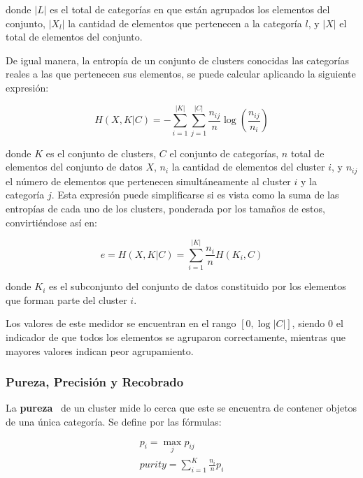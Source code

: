 \noindent
donde $|L|$ es el total de categorías en que están agrupados los elementos del conjunto, $|X_l|$ la cantidad de elementos que pertenecen a la categoría $l$, y $|X|$ el total de elementos del conjunto.

De igual manera, la entropía de un conjunto de clusters conocidas las categorías reales a las que pertenecen sus elementos, se puede calcular aplicando la siguiente expresión:

\begin{equation}
    \label{eq:clustering-entropy-conditional}
    H(X, K|C) = -\sum_{i=1}^{|K|}\sum_{j=1}^{|C|}{\frac{n_{ij}}{n}\log \left( \frac{n_{ij}}{n_i} \right)}
\end{equation}

\noindent
donde $K$ es el conjunto de clusters, $C$ el conjunto de categorías, $n$ total de elementos del conjunto de datos $X$, $n_i$ la cantidad de elementos del cluster $i$, y $n_{ij}$ el número de elementos que pertenecen simultáneamente al cluster $i$ y la categoría $j$.
Esta expresión puede simplificarse si es vista como la suma de las entropías de cada uno de los clusters, ponderada por los tamaños de estos, convirtiéndose así en:

\begin{equation}
    \label{eq:clustering-entropy}
    e = H(X, K|C) = \sum_{i=1}^{|K|}{\frac{n_i}{n}H(K_i,C)}
\end{equation}

\noindent
donde $K_i$ es el subconjunto del conjunto de datos constituido por los elementos que forman parte del cluster $i$.

Los valores de este medidor se encuentran en el rango $[0, \log|C|]$, siendo 0 el indicador de que todos los elementos se agruparon correctamente, mientras que mayores valores indican peor agrupamiento.

\subsubsection{Pureza, Precisión y Recobrado}

La \textbf{pureza}~\cite{Tan05,Aggarawal13} de un cluster mide lo cerca que este se encuentra de contener objetos de una única categoría.
Se define por las fórmulas:

\begin{gather}
    \label{eq:cluster-purity}
    p_i =\max_{j}{p_{ij}} \\
    \label{eq:purity}
    purity = \sum_{i=1}^{K}{\frac{n_i}{n}p_i}
\end{gather}

